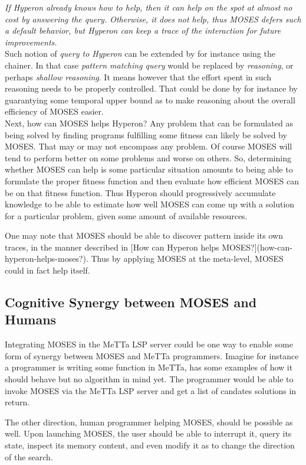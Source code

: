\documentclass[]{report}
\begin{document}
\emph{If Hyperon already knows how to help, then it can help on the spot at
almost no cost by answering the query.  Otherwise, it does not help,
thus MOSES defers such a default behavior, but Hyperon can keep a
trace of the interaction for future improvements.}\\

Such notion of \emph{query to Hyperon} can be extended by for instance
using the chainer.  In that case \emph{pattern matching query} would
be replaced by \emph{reasoning}, or perhaps \emph{shallow reasoning}.
It means however that the effort spent in such reasoning needs to be
properly controlled.  That could be done by for instance by
guarantying some temporal upper bound as to make reasoning about the
overall efficiency of MOSES easier.\\

Next, how can MOSES helps Hyperon? Any problem that can be formulated
as being solved by finding programs fulfilling some fitness can likely
be solved by MOSES.  That may or may not encompass any problem.  Of
course MOSES will tend to perform better on some problems and worse on
others.  So, determining whether MOSES can help is some particular
situation amounts to being able to formulate the proper fitness
function and then evaluate how efficient MOSES can be on that fitness
function.  Thus Hyperon should progressively accumulate knowledge to
be able to estimate how well MOSES can come up with a solution for a
particular problem, given some amount of available resources.

One may note that MOSES should be able to discover pattern inside its
own traces, in the manner described in [How can Hyperon helps
MOSES?](how-can-hyperon-helps-moses?).  Thus by applying MOSES at the
meta-level, MOSES could in fact help itself.

\subsection{Cognitive Synergy between MOSES and Humans}

Integrating MOSES in the MeTTa LSP server could be one way to enable
some form of synergy between MOSES and MeTTa programmers.  Imagine for
instance a programmer is writing some function in MeTTa, has some
examples of how it should behave but no algorithm in mind yet.  The
programmer would be able to invoke MOSES via the MeTTa LSP server and
get a list of candates solutions in return.

The other direction, human programmer helping MOSES, should be
possible as well.  Upon launching MOSES, the user should be able to
interrupt it, query its state, inspect its memory content, and even
modify it as to change the direction of the search.
\end{document}

